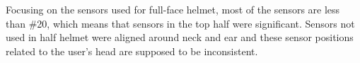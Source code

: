 \documentclass[sigchi,authordraft]{acmart}
\begin{document}

Focusing on the sensors used for full-face helmet, most of the sensors are less than \#20, which means that sensors in the top half were significant. Sensors not used in half helmet were aligned around neck and ear and these sensor positions related to the user's head are supposed to be inconsistent. 


\end{document}
